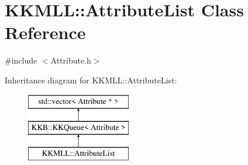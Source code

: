 \hypertarget{class_k_k_m_l_l_1_1_attribute_list}{}\section{K\+K\+M\+LL\+:\+:Attribute\+List Class Reference}
\label{class_k_k_m_l_l_1_1_attribute_list}


{\ttfamily \#include $<$Attribute.\+h$>$}

Inheritance diagram for K\+K\+M\+LL\+:\+:Attribute\+List\+:\begin{figure}[H]
\begin{center}
\leavevmode
\includegraphics[height=3.000000cm]{class_k_k_m_l_l_1_1_attribute_list}
\end{center}
\end{figure}
